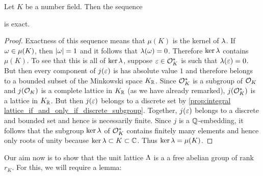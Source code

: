     \begin{proposition}\label{prop:exact_sequence_for_Dirichlets_unit_theorem}
      Let $K$ be a number field. Then the sequence

      \begin{center}
      \end{center}

      is exact.
    \end{proposition}
    \begin{proof}
      Exactness of this sequence means that $\mu(K)$ is the kernel of $\lambda$. If $\omega \in \mu(K)$, then $|\omega| = 1$ and it follows that $\lambda(\omega) = 0$. Therefore $\ker\lambda$ contains $\mu(K)$. To see that this is all of $\ker\lambda$, suppose $\varepsilon \in \mathcal{O}_{K}^{\ast}$ is such that $\lambda(\varepsilon) = 0$. But then every component of $j(\varepsilon)$ is has absolute value $1$ and therefore belongs to a bounded subset of the Minkowski space $K_{\mathbb{R}}$. Since $\mathcal{O}_{K}^{\ast}$ is a subgroup of $\mathcal{O}_{K}$ and $j(\mathcal{O}_{K})$ is a complete lattice in $K_{\mathbb{R}}$ (as we have already remarked), $j(\mathcal{O}_{K}^{\ast})$ is a lattice in $K_{\mathbb{R}}$. But then $j(\varepsilon)$ belongs to a discrete set by \cref{prop:integral lattice_if_and_only_if_discrete_subgroup}. Together, $j(\varepsilon)$ belongs to a discrete and bounded set and hence is necessarily finite. Since $j$ is a $\mathbb{Q}$-embedding, it follows that the subgroup $\ker\lambda$ of $\mathcal{O}_{K}^{\ast}$ contains finitely many elements and hence only roots of unity because $\ker\lambda \subset K \subset \mathbb{C}$. Thus $\ker\lambda = \mu(K)$.
    \end{proof}

    Our aim now is to show that the unit lattice $\Lambda$ is a a free abelian group of rank $r_{K}$. For this, we will require a lemma:

